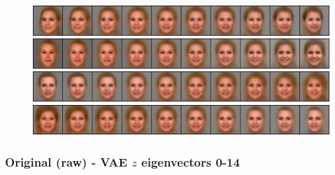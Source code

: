\documentclass{article}
\begin{document}
\begin{figure}[H]
  \includegraphics[width=0.9\linewidth]{eigen/grey_vae_11.png}
  \includegraphics[width=0.9\linewidth]{eigen/grey_vae_12.png}
  \includegraphics[width=0.9\linewidth]{eigen/grey_vae_13.png}
  \includegraphics[width=0.9\linewidth]{eigen/grey_vae_14.png}
\end{figure}

\newpage

\subsubsection*{Original (raw) - VAE $z$ eigenvectors 0-14}
\end{document}

